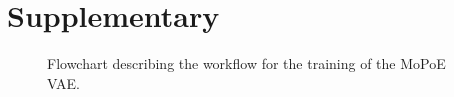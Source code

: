 \renewcommand{\thetable}{S\arabic{table}}
\setcounter{figure}{0}
\renewcommand{\thefigure}{S\arabic{figure}}

\section{Supplementary}

\begin{figure}
    \hspace*{-3cm}
    \label{fig:flowchart}
    \caption{Flowchart describing the workflow for the training of the MoPoE VAE.}

\end{figure}
